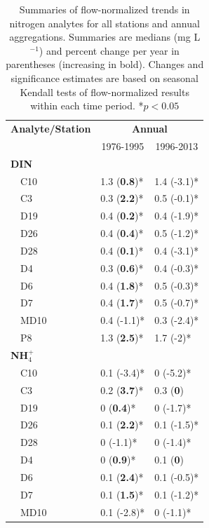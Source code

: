 \documentclass[letterpaper,12pt,oneside]{article}\usepackage[]{graphicx}\usepackage[]{color}
\begin{document}
\begin{table}[!tbp]
\caption{Summaries of flow-normalized trends in nitrogen analytes for all stations and annual aggregations. Summaries are  medians (mg L$^{-1}$) and percent change per year in parentheses (increasing in bold). Changes and significance estimates are based on seasonal Kendall tests of flow-normalized results within each time period. *$p<0.05$\label{tab:trndsann}} 
\begin{center}
\begin{tabular}{lll}
\hline\hline
\multicolumn{1}{l}{\bfseries Analyte/Station}&\multicolumn{2}{c}{\bfseries Annual}\tabularnewline
\cline{2-3}
\multicolumn{1}{l}{}&\multicolumn{1}{c}{1976-1995}&\multicolumn{1}{c}{1996-2013}\tabularnewline
\hline
{\bfseries DIN}&&\tabularnewline
~~C10&1.3 \footnotesize{(\textbf{0.8})*}&1.4 \footnotesize{(-3.1)*}\tabularnewline
~~C3&0.3 \footnotesize{(\textbf{2.2})*}&0.5 \footnotesize{(-0.1)*}\tabularnewline
~~D19&0.4 \footnotesize{(\textbf{0.2})*}&0.4 \footnotesize{(-1.9)*}\tabularnewline
~~D26&0.4 \footnotesize{(\textbf{0.4})*}&0.5 \footnotesize{(-1.2)*}\tabularnewline
~~D28&0.4 \footnotesize{(\textbf{0.1})*}&0.4 \footnotesize{(-3.1)*}\tabularnewline
~~D4&0.3 \footnotesize{(\textbf{0.6})*}&0.4 \footnotesize{(-0.3)*}\tabularnewline
~~D6&0.4 \footnotesize{(\textbf{1.8})*}&0.5 \footnotesize{(-0.3)*}\tabularnewline
~~D7&0.4 \footnotesize{(\textbf{1.7})*}&0.5 \footnotesize{(-0.7)*}\tabularnewline
~~MD10&0.4 \footnotesize{(-1.1)*}&0.3 \footnotesize{(-2.4)*}\tabularnewline
~~P8&1.3 \footnotesize{(\textbf{2.5})*}&1.7 \footnotesize{(-2)*}\tabularnewline
\hline
{\bfseries NH$_{4}^{+}$}&&\tabularnewline
~~C10&0.1 \footnotesize{(-3.4)*}&0 \footnotesize{(-5.2)*}\tabularnewline
~~C3&0.2 \footnotesize{(\textbf{3.7})*}&0.3 \footnotesize{(\textbf{0})}\tabularnewline
~~D19&0 \footnotesize{(\textbf{0.4})*}&0 \footnotesize{(-1.7)*}\tabularnewline
~~D26&0.1 \footnotesize{(\textbf{2.2})*}&0.1 \footnotesize{(-1.5)*}\tabularnewline
~~D28&0 \footnotesize{(-1.1)*}&0 \footnotesize{(-1.4)*}\tabularnewline
~~D4&0 \footnotesize{(\textbf{0.9})*}&0.1 \footnotesize{(\textbf{0})}\tabularnewline
~~D6&0.1 \footnotesize{(\textbf{2.4})*}&0.1 \footnotesize{(-0.5)*}\tabularnewline
~~D7&0.1 \footnotesize{(\textbf{1.5})*}&0.1 \footnotesize{(-1.2)*}\tabularnewline
~~MD10&0.1 \footnotesize{(-2.8)*}&0 \footnotesize{(-1.1)*}\tabularnewline

\end{tabular}
\end{center}
\end{table}
\end{document}
